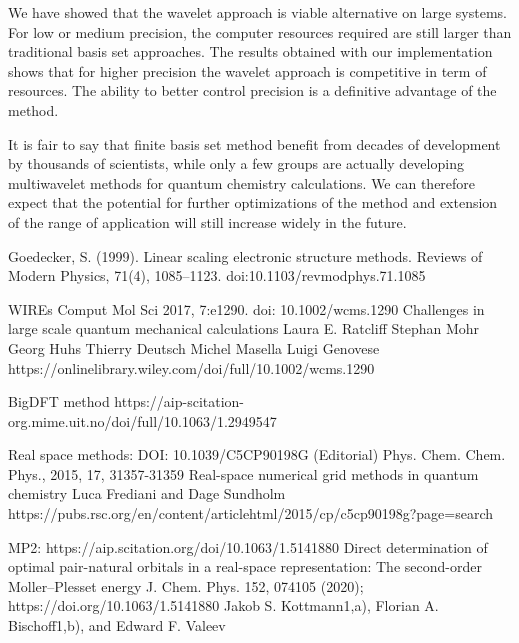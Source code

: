 \documentclass{article}
\begin{document}


We have showed that the wavelet approach is viable alternative on large systems. For low or medium precision, the computer resources required are still larger than traditional basis set approaches. The results obtained with our implementation shows that for higher precision the wavelet approach is competitive in term of resources. 
The ability to better control precision is a definitive advantage of the method. 



It is fair to say that finite basis set method benefit from decades of development by thousands of scientists, while only a few groups are actually developing multiwavelet methods for quantum chemistry calculations. We can therefore expect that the potential for further optimizations of the method and extension of the range of application will still increase widely in the future.




Goedecker, S. (1999). Linear scaling electronic structure methods. Reviews of Modern Physics, 71(4), 1085–1123. doi:10.1103/revmodphys.71.1085 

WIREs Comput Mol Sci 2017, 7:e1290. doi: 10.1002/wcms.1290
Challenges in large scale quantum mechanical calculations
Laura E. Ratcliff
Stephan Mohr
Georg Huhs
Thierry Deutsch
Michel Masella
Luigi Genovese
https://onlinelibrary.wiley.com/doi/full/10.1002/wcms.1290

BigDFT method
https://aip-scitation-org.mime.uit.no/doi/full/10.1063/1.2949547

Real space methods:
 DOI: 10.1039/C5CP90198G (Editorial) Phys. Chem. Chem. Phys., 2015, 17, 31357-31359
Real-space numerical grid methods in quantum chemistry
Luca Frediani and Dage Sundholm
https://pubs.rsc.org/en/content/articlehtml/2015/cp/c5cp90198g?page=search


MP2:
https://aip.scitation.org/doi/10.1063/1.5141880
Direct determination of optimal pair-natural orbitals in a real-space representation: The second-order Moller–Plesset energy
 J. Chem. Phys. 152, 074105 (2020); https://doi.org/10.1063/1.5141880
Jakob S. Kottmann1,a), Florian A. Bischoff1,b), and Edward F. Valeev
\end{document}
